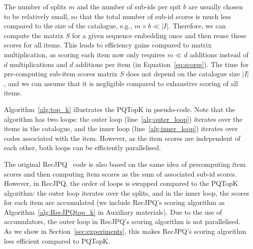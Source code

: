 \documentclass[sigconf,natbib=true, review=true]{acmart} %
\newcommand{\pageenlarge}[1]{\marginnote{#1}\enlargethispage{#1\baselineskip}}
\newcommand{\sasha}[1]{\textcolor[HTML]{000000}{#1}}
\newcommand{\rsasha}[1]{\textcolor[HTML]{FF0000}{#1}}
\begin{document}
The number of splits $m$ and the number of sub-ids per spit $b$ are usually chosen to be relatively small, 
so that the total number of sub-id scores is much less compared to the size of the catalogue, e.g., $m\times b \ll |I|$.
%
Therefore, we can \rsasha{compute} the matrix $S$ \sasha{for a given sequence embedding} once and then reuse these scores for all items. This leads to efficiency gains compared to matrix multiplication, as scoring each item now only requires $m \ll d$ additions instead of $d$ multiplications and $d$ additions per item (in Equation~\eqref{eq:scores}). The time for pre-computing sub-item scores matrix $S$ does not depend on the catalogue size $|I|$, and 
we can assume that it is negligible compared to exhaustive scoring of all items. 

Algorithm~\ref{alg:top_k} illustrates the PQTopK in pseudo-code. Note that the algorithm has two loops: the outer loop (line~\ref{alg:outer_loop}) iterates over the items in the catalogue, and the inner loop (line~\ref{alg:inner_loop}) iterates over codes associated with the item. However, as the item scores are independent of each other, both loops can be efficiently parallelised. 

 The original RecJPQ~\cite{petrovRecJPQTrainingLargeCatalogue2024} code is also based on the same idea of precomputing item scores and then computing item scores as the sum of associated sub-id scores. However, in RecJPQ, the order of loops is swapped compared to the PQTopK algorithm: the outer loop iterates over the splits, and in the inner loop, the scores for each item are accumulated (we include RecJPQ's scoring algorithm as  Algorithm~\ref{alg:RecJPQtop_k} in Auxiliary materials). Due to the use of accumulators, the outer loop in RecJPQ's scoring algorithm is not parallelised. As we show in Section~\ref{sec:experiments}, this makes RecJPQ's scoring algorithm less efficient compared to PQTopK. 
\end{document}
